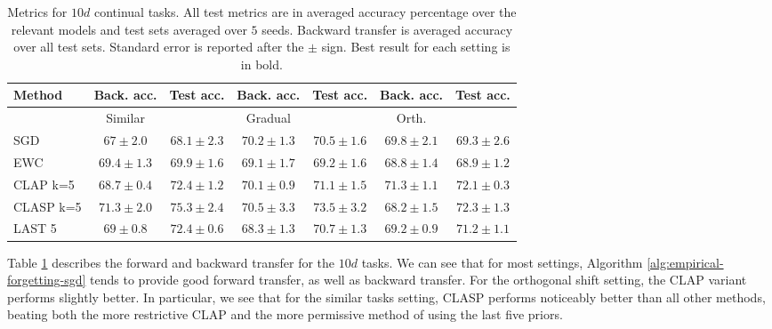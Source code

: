 \documentclass{article}
\theoremstyle{plain}
\theoremstyle{definition}
\theoremstyle{remark}
\newcommand{\RM}[1]{{\textcolor{magenta}{#1}}}
\begin{document}
\begin{table}[t]
\caption{Metrics for $10d$ continual tasks. All test metrics are in averaged accuracy percentage over the relevant models and test sets averaged over $5$ seeds. Backward transfer is averaged accuracy over all test sets. Standard error is reported after the $\pm$ sign. Best result for each setting is in bold.} 
\label{2d-full-table}
\vskip 0.15in
\begin{center}
\begin{small}
\begin{sc}
\begin{tabular}{lcccccc}
\toprule
Method & Back. acc. & Test acc. & Back. acc. & Test acc. & Back. acc. & Test acc. \\
\midrule
& Similar  & & Gradual & & Orth.  \\
\midrule
SGD    & $67\pm 2.0$ & $68.1\pm  2.3$ & $70.2\pm 1.3$ & $70.5\pm  1.6$ & $69.8\pm 2.1$ & $69.3\pm  2.6$ \\
EWC & $69.4\pm 1.3$ & $69.9 \pm 1.6$ & $69.1\pm 1.7$ & $69.2 \pm 1.6$ & $68.8\pm 1.4$ & $68.9 \pm 1.2$\\
CLAP k=5    & $68.7 \pm 0.4$ & $72.4 \pm 1.2$  & $70.1 \pm 0.9$ & $71.1 \pm 1.5$ & $\mathbf{71.3} \pm 1.1$ & $72.1 \pm 0.3$\\
CLASP k=5    & $\mathbf{71.3} \pm 2.0$& $\mathbf{75.3} \pm 2.4$ & $\mathbf{70.5} \pm 3.3$& $\mathbf{73.5} \pm 3.2$  & $68.2 \pm 1.5$& $\mathbf{72.3} \pm 1.3$      \\
LAST 5  & $69\pm 0.8$& $72.4\pm 0.6$  & $68.3\pm 1.3$& $70.7\pm 1.3$  & $69.2\pm 0.9$& $71.2\pm 1.1$    \\
\bottomrule
\end{tabular}
\end{sc}
\end{small}
\end{center}
\vskip -0.1in
\end{table}

Table \ref{2d-full-table} describes the forward and backward transfer for the $10d$ tasks. We can see that for most settings, Algorithm \ref{alg:empirical-forgetting-sgd} tends to provide good forward transfer, as well as backward transfer. For the orthogonal shift setting, the CLAP variant performs slightly better. In particular, we see that for the similar tasks setting, CLASP performs noticeably better than all other methods, beating both the more restrictive CLAP and the more permissive method of using the last five priors.
\end{document}
